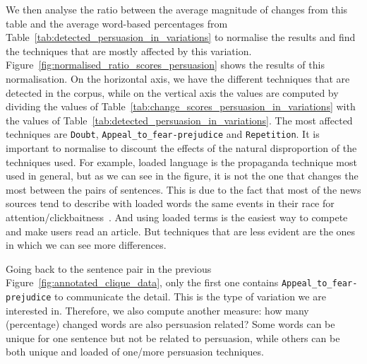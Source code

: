 We then analyse the ratio between the average magnitude of changes from this table and the average word-based percentages from Table~\ref{tab:detected_persuasion_in_variations} to normalise the results and find the techniques that are mostly affected by this variation.
Figure~\ref{fig:normalised_ratio_scores_persuasion} shows the results of this normalisation.
On the horizontal axis, we have the different techniques that are detected in the corpus, while on the vertical axis the values are computed by dividing the values of Table~\ref{tab:change_scores_persuasion_in_variations} with the values of Table~\ref{tab:detected_persuasion_in_variations}.
The most affected techniques are \texttt{Doubt}, \texttt{Appeal\_to\_fear-prejudice} and \texttt{Repetition}.
It is important to normalise to discount the effects of the natural disproportion of the techniques used.
For example, loaded language is the propaganda technique most used in general, but as we can see in the figure, it is not the one that changes the most between the pairs of sentences. This is due to the fact that
most of the news sources tend to describe with loaded words the same events in their race for attention/clickbaitness~\citep{bazaco2019clickbait,davenport2001attention}.
And using loaded terms is the easiest way to compete and make users read an article. But techniques that are less evident are the ones in which we can see more differences.


Going back to the sentence pair in the previous Figure~\ref{fig:annotated_clique_data}, only the first one contains \texttt{Appeal\_to\_fear-prejudice} to communicate the detail. This is the type of variation we are interested in.
%
Therefore, we also compute another measure: how many (percentage) changed words are also persuasion related? Some words can be unique for one sentence but not be related to persuasion, while others can be both unique and loaded of one/more persuasion techniques.

